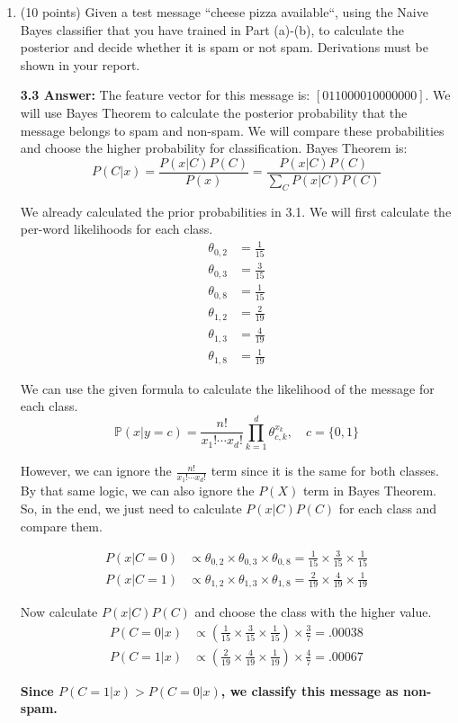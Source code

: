 \documentclass[12pt]{article}
\begin{document}
\begin{enumerate}
\item (10 points) Given a test message ``\textsf{cheese pizza available}``, using the Naive Bayes classifier that you have trained in Part (a)-(b), to calculate the posterior and decide whether it is spam or not spam. Derivations must be shown in your report.

{\bf 3.3 Answer:} The feature vector for this message is: $[011000010000000]$. We will use Bayes Theorem to calculate the posterior probability that the message belongs to spam and non-spam. We will compare these probabilities and choose the higher probability for classification. Bayes Theorem is: 
\[P(C|x) = \frac{P(x|C)P(C)}{P(x)} = \frac{P(x|C)P(C)}{\sum_C P(x|C)P(C)}\]

We already calculated the prior probabilities in 3.1. We will first calculate the per-word likelihoods for each class.
\begin{align*}
\theta_{0,2} &= \frac{1}{15} \\
\theta_{0,3} &= \frac{3}{15} \\
\theta_{0,8} &= \frac{1}{15} \\
\theta_{1,2} &= \frac{2}{19} \\
\theta_{1,3} &= \frac{4}{19} \\
\theta_{1,8} &=\frac{1}{19}
\end{align*}

We can use the given formula to calculate the likelihood of the message for each class.
\[
 \mathbb P (x|y = c) = \frac{n!}{x_1! \cdots x_d!}\prod_{k=1}^d \theta_{c, k}^{x_k}, \quad c = \{0, 1\}
\]

However, we can ignore the $\frac{n!}{x_1! \cdots x_d!}$ term since it is the same for both classes. By that same logic, we can also ignore the $P(X)$ term in Bayes Theorem. So, in the end, we just need to calculate $P(x|C)P(C)$ for each class and compare them.

\begin{align*}
    P(x|C=0) &\propto \theta_{0,2} \times \theta_{0,3} \times \theta_{0,8} =  \frac{1}{15} \times\frac{3}{15} \times \frac{1}{15} \\
    P(x|C=1) &\propto \theta_{1,2} \times \theta_{1,3} \times \theta_{1,8} =  \frac{2}{19} \times\frac{4}{19} \times \frac{1}{19}
\end{align*}

Now calculate $P(x|C)P(C)$ and choose the class with the higher value.
\begin{align*}
    P(C=0|x) &\propto (\frac{1}{15} \times\frac{3}{15} \times \frac{1}{15})\times \frac{3}{7} = .00038\\
    P(C=1|x) &\propto (\frac{2}{19} \times\frac{4}{19} \times \frac{1}{19})\times \frac{4}{7} = .00067
\end{align*}

\bf Since $P(C=1|x) > P(C=0|x)$, we classify this message as non-spam.

\end{enumerate}
\end{document}
